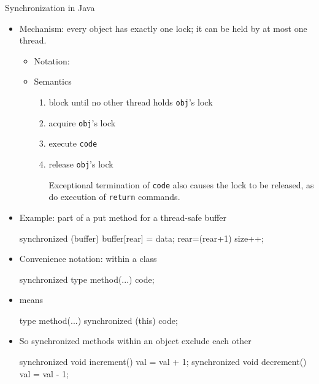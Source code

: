 \documentclass{concdistfoils}
\def\heading#1{\begin{cframed}[8.8in]{#1}\end{cframed}}
\begin{document}
\begin{slide}
\heading{Synchronization in Java}
\vfill
\begin{itemize}
\item Mechanism: every object has exactly one lock; it can be held by at most one thread.
\vfill
\begin{itemize}
\item Notation: 
\vfill
\item Semantics
\begin{enumerate}
\item   block until no other thread holds \texttt{obj}'s lock
\item   acquire \texttt{obj}'s lock
\item   execute \texttt{code}
\item   release \texttt{obj}'s lock
\begin{note}
Exceptional termination of \texttt{code} also causes the lock to be released, as
do execution of \texttt{return} commands.
\end{note}
\end{enumerate}
\vfill
\end{itemize}
\item Example: part of a put method for a thread-safe buffer
\begin{java*}[frame={}]{}
          synchronized (buffer) 
          { buffer[rear] = data; 
            rear=(rear+1)%
            size++; 
          }
\end{java*}
\end{itemize}
\end{slide}

\begin{slide}
\begin{itemize}
\item Convenience notation: within a class
\begin{java}

        synchronized type method(...) { code; } 
\end{java}
\item[] means
\begin{java}

        type method(...) { synchronized (this) { code; } }
\end{java}
\vfill
\item So synchronized methods within an object exclude each other
\begin{java}

        synchronized void increment() { val = val + 1; }
        synchronized void decrement() { val = val - 1; }
\end{java}
\end{itemize}
\end{slide}
\end{document}
